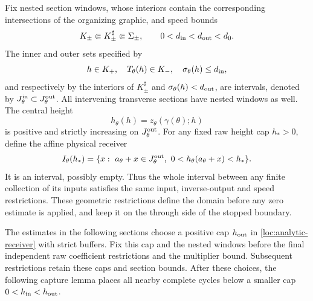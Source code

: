 Fix nested section windows, whose interiors contain the corresponding
intersections of the organizing graphic, and speed bounds
\begin{equation}\label{loc:nested-buffers}
 K_\pm\Subset K_\pm^\sharp\Subset\Sigma_\pm,\qquad
 0<d_{\rm in}<d_{\rm out}<d_0 .
\end{equation}
The inner and outer sets specified by
\[
 h\in K_+,\quad T_\theta(h)\in K_-,\quad \sigma_\theta(h)\le d_{\rm in},
\]
and respectively by the interiors of \(K_\pm^\sharp\) and
\(\sigma_\theta(h)<d_{\rm out}\), are intervals, denoted by
\(J_\theta^{\rm in}\subset J_\theta^{\rm out}\).
All intervening transverse sections have nested windows as well.
The central height
\begin{equation}\label{loc:central-height}
 h_\theta(h)=z_\theta(\gamma(\theta);h)
\end{equation}
is positive and strictly increasing on \(J_\theta^{\rm out}\).
For any fixed raw height cap \(h_*>0\), define the affine physical
receiver
\begin{equation}\label{loc:analytic-receiver}
 I_\theta(h_*)=
 \{x:\ a_\theta+x\in J_\theta^{\rm out},
       \ 0<h_\theta(a_\theta+x)<h_*\}.
\end{equation}
It is an interval, possibly empty. Thus the whole interval between any
finite collection of its inputs satisfies the same input, inverse-output
and speed restrictions. These geometric restrictions define the domain
before any zero estimate is applied, and keep it on the through side of
the stopped boundary.

The estimates in the following sections choose a positive cap
\(h_{\rm out}\) in \eqref{loc:analytic-receiver} with strict buffers.
Fix this cap and the nested windows before the final independent raw
coefficient restrictions and the multiplier bound. Subsequent restrictions
retain these caps and section bounds. After these choices, the following
capture lemma places all nearby complete cycles below a smaller cap
\(0<h_{\rm in}<h_{\rm out}\).


